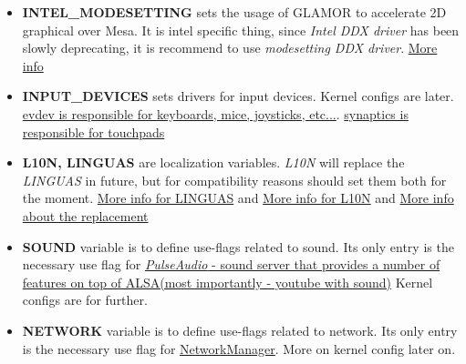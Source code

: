 \documentclass[10pt,a4paper]{article}
\begin{document}
\begin{itemize}
                    \item \textbf{INTEL\_MODESETTING} sets the usage of GLAMOR to accelerate 2D graphical over Mesa. It is intel specific thing, since \textit{Intel DDX driver} has been slowly deprecating, it is recommend to use \textit{modesetting DDX driver}. \href{https://wiki.gentoo.org/wiki/Intel#Modesetting_DDX}{More info}



                    \item \textbf{INPUT\_DEVICES} sets drivers for input devices. Kernel configs are later. \href{https://wiki.gentoo.org/wiki/Evdev#Driver}{evdev is responsible for keyboards, mice, joysticks, etc...}. \href{https://wiki.gentoo.org/wiki/Synaptics#Driver}{synaptics is responsible for touchpads}



                    \item \textbf{L10N, LINGUAS} are localization variables. \textit{L10N} will replace the \textit{LINGUAS} in future, but for compatibility reasons should set them both for the moment. \href{https://wiki.gentoo.org/wiki/Localization/Guide#LINGUAS}{More info for LINGUAS} and \href{https://wiki.gentoo.org/wiki/Localization/Guide#L10N}{More info for L10N} and \href{https://www.gentoo.org/support/news-items/2016-06-23-l10n-use_expand.html}{More info about the replacement}



                    \item \textbf{SOUND} variable is to define use-flags related to sound. Its only entry is the necessary use flag for \href{https://wiki.gentoo.org/wiki/PulseAudio#Software}{\textit{PulseAudio} - sound server that provides a number of features on top of ALSA(most importantly - youtube with sound)} Kernel configs are for further.



                    \item \textbf{NETWORK} variable is to define use-flags related to network. Its only entry is the necessary use flag for \href{https://wiki.gentoo.org/wiki/NetworkManager#Installation}{NetworkManager}. More on kernel config later on.


\end{itemize}
\end{document}
